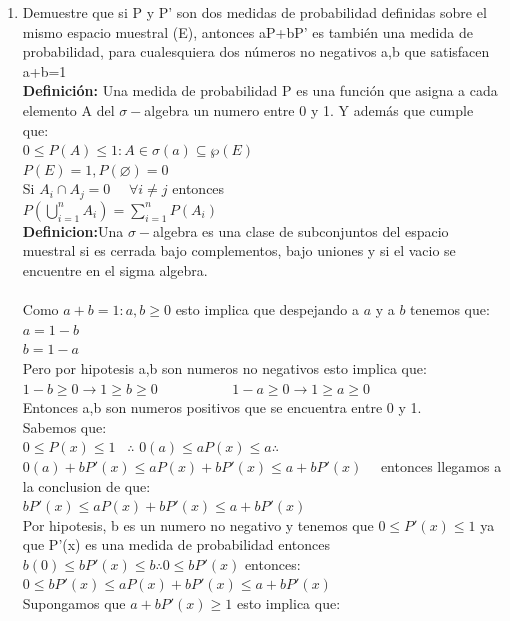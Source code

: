\documentclass[12pt,a4paper]{report}
\begin{document}
\begin{enumerate}
   \item {
    Demuestre que si P y P' son dos medidas de probabilidad definidas sobre el mismo espacio muestral (E), antonces aP+bP' es también una medida de probabilidad, para cualesquiera dos números no negativos a,b que satisfacen a+b=1\\
    \textbf{Definición:} Una medida de probabilidad P es una función que asigna a cada elemento A del $\sigma-$algebra un numero entre 0 y 1. Y además que cumple que:\\
    $0 \leq P(A) \leq 1 : A \in \sigma(a)\subseteq \wp(E)$\\
    $P(E)=1, P(\varnothing)=0$\\
    Si $A_{i} \cap A_{j} = 0 $ \ \ $\forall i \neq j $ entonces\\
    $P(\bigcup\limits_{i=1}^{n} A_{i})= \sum_{i=1}^{n} P(A_{i})$\\
    \textbf{Definicion:}Una $\sigma-$algebra es una clase de subconjuntos del espacio muestral si es cerrada bajo complementos, bajo uniones y si el  vacio se encuentre en el sigma algebra.\\ \\
    Como $a+b=1 : a,b \geq 0$ esto implica que despejando a $a$ y a $b$ tenemos que:\\
    $a=1-b$\\
    $b=1-a$\\
    Pero por hipotesis a,b son numeros no negativos esto implica que:\\
    $1-b \geq 0 \rightarrow 1 \geq b \geq 0$ \ \ \ \ \ \ \ \ \ \
    $1-a \geq 0 \rightarrow 1\geq a \geq 0$ \\
    Entonces a,b son numeros positivos que se encuentra entre 0 y 1. \\
    Sabemos que:\\
    $0 \leq P(x) \leq 1$ \ $\therefore$ $0(a)\leq aP(x) \leq a \therefore $ \\$ 0(a)+bP'(x)\leq aP(x)+bP'(x) \leq a+bP'(x)$ \ \ entonces llegamos a la conclusion de que:\\
    $bP'(x)\leq aP(x)+bP'(x) \leq a+bP'(x)$\\
    Por hipotesis, b es un numero no negativo y tenemos que $0\leq P'(x)\leq 1$ ya que P'(x) es una medida de probabilidad entonces $b(0)\leq bP'(x) \leq b \therefore 0\leq bP'(x)$ entonces:\\
    $0\leq bP'(x)\leq aP(x)+bP'(x)\leq a+bP'(x)$\\
    Supongamos que $a+bP'(x)\geq 1$ esto implica que:\\
}
\end{enumerate}
\end{document}
